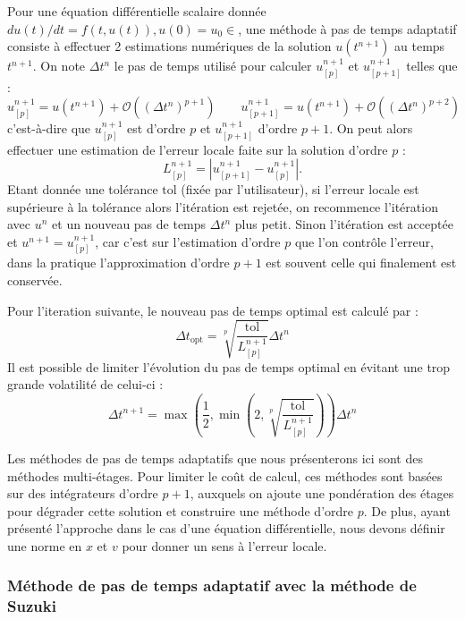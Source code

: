 Pour une équation différentielle scalaire donnée $du(t)/dt = f(t, u(t)), u(0)=u_0\in$, une méthode à pas de temps adaptatif consiste à effectuer 2 estimations numériques de la solution $u(t^{n+1})$ au temps $t^{n+1}$. On note $\Delta t^n$ le pas de temps utilisé pour calculer $u^{n+1}_{[p]}$ et $u^{n+1}_{[p+1]}$ telles que :
$$
  u^{n+1}_{[p]} = u(t^{n+1}) + \mathcal{O}((\Delta t^n)^{p+1}) \qquad u^{n+1}_{[p+1]} = u(t^{n+1}) + \mathcal{O}((\Delta t^n)^{p+2})
$$
c'est-à-dire que $u^{n+1}_{[p]}$ est d'ordre $p$ et $u^{n+1}_{[p+1]}$ d'ordre $p+1$. On peut alors effectuer une estimation de l'erreur locale faite sur la solution d'ordre $p$ :
$$
  L_{[p]}^{n+1} =  |u^{n+1}_{[p+1]} - u^{n+1}_{[p]}|. 
$$
Etant donnée une tolérance $\text{tol}$ (fixée par l'utilisateur), si l'erreur locale est supérieure à la tolérance alors l'itération est rejetée, on recommence l'itération avec $u^n$ et un nouveau pas de temps $\Delta t^n$ plus petit. Sinon l'itération est acceptée et $u^{n+1} = u^{n+1}_{[p]}$, car c'est sur l'estimation d'ordre $p$ que l'on contrôle l'erreur, dans la pratique l'approximation d'ordre $p+1$ est souvent celle qui finalement est conservée.

Pour l'iteration suivante, le nouveau pas de temps optimal est calculé par :
\begin{equation}
  \Delta t_\text{opt} = \sqrt[p]{\frac{\text{tol}}{L_{[p]}^{n+1}}}\Delta t^n
  \label{eq:dtopt}
\end{equation}
Il est possible de limiter l'évolution du pas de temps optimal en évitant une trop grande volatilité de celui-ci :
$$
  \Delta t^{n+1} = \max\left(\frac{1}{2},\min\left(2,\sqrt[p]{\frac{\text{tol}}{L_{[p]}^{n+1}}}\right)\right)\Delta t^n
$$

Les méthodes de pas de temps adaptatifs que nous présenterons ici sont des méthodes multi-étages. Pour limiter le coût de calcul, ces méthodes sont basées sur des intégrateurs d'ordre $p+1$, auxquels on ajoute une pondération des étages pour dégrader cette solution et construire une méthode d'ordre $p$. De plus, ayant présenté l'approche dans le cas d'une équation différentielle, nous devons définir une norme en $x$ et $v$ pour donner un sens à l'erreur locale.  


\subsubsection{Méthode de pas de temps adaptatif avec la méthode de Suzuki}

